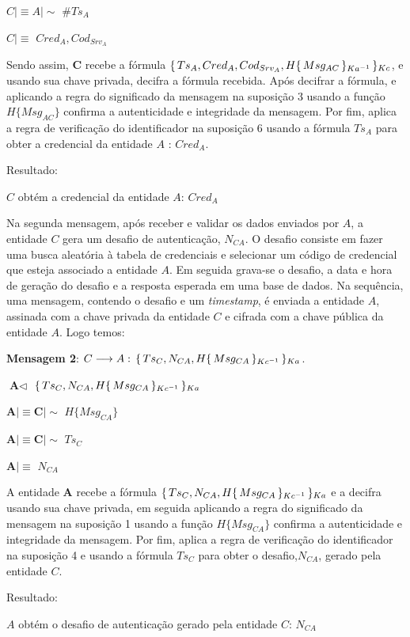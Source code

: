 $C\mid\equiv A \mid\sim$ ${\#Ts_A}$

$C\mid\equiv$ ${Cred_A,Cod_{Srv_A}}$

Sendo assim, ${\textbf{C}}$ recebe a fórmula ${\{\,{Ts_A,Cred_A,Cod_{Srv_A},H{\{\,{Msg_{AC}}\,\}_{Ka ^{-1}}}}\,\}_{Kc}}$, e usando sua chave privada, decifra a fórmula recebida. Após decifrar a fórmula, e aplicando a regra do significado da mensagem na suposição 3 usando a função $H \{Msg_{AC}\}$ confirma a autenticidade e integridade da mensagem. Por fim, aplica a regra de verificação do identificador na suposição 6 usando a fórmula ${Ts_A}$ para obter a credencial da entidade ${A}$ :  ${Cred_A}$.

Resultado:

${C}$ obtém  a credencial da entidade $A$: ${Cred_A}$

Na segunda mensagem, após receber e validar os dados enviados por $A$, a entidade ${C}$ gera um desafio de autenticação, ${N_{CA}}$. O desafio consiste em fazer uma busca aleatória à tabela de credenciais e selecionar um código de credencial que esteja associado a entidade $A$. Em seguida grava-se o desafio, a data e hora de geração do desafio e a resposta esperada em uma base de dados. Na sequência, uma mensagem, contendo o desafio e um \emph{timestamp}, é enviada a entidade $A$, assinada com a chave privada da entidade ${C}$ e cifrada com a chave pública da entidade ${A}$. Logo temos:

\textbf{Mensagem 2}: ${C}\longrightarrow{A}:\,{\{\,{Ts_C,{N_{CA}},H{\{\,{Msg_{CA}}\,\}_{Kc ^{-1}}}}\,\}_{Ka}}$.

$\textbf{A}\triangleleft$ ${\{\,{Ts_C,{N_{CA}},H{\{\,{Msg_{CA}}\,\}_{Kc ^{-1}}}}\,\}_{Ka}}$

$\textbf{A}\mid\equiv \textbf{C} \mid\sim $  $H \{Msg_{CA}\}$

$\textbf{A}\mid\equiv \textbf{C} \mid\sim$ ${Ts_C}$

$\textbf{A}\mid\equiv$ ${N_{CA}}$

A entidade ${\textbf{A}}$ recebe a fórmula ${\{\,{Ts_C,{N_{CA}},H{\{\,{Msg_{CA}}\,\}_{Kc ^{-1}}}}\,\}_{Ka}}$ e a decifra usando sua chave privada, em seguida aplicando a regra do significado da mensagem na suposição 1 usando a função $H \{Msg_{CA}\}$ confirma a autenticidade e integridade da mensagem. Por fim, aplica a regra de verificação do identificador na suposição 4 e usando a fórmula ${Ts_C}$ para obter o desafio,${N_{CA}}$, gerado pela entidade ${C}$.

Resultado:

${A}$ obtém  o desafio de autenticação gerado pela entidade ${C}$: ${N_{CA}}$

